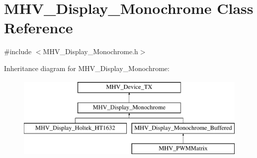 \hypertarget{class_m_h_v___display___monochrome}{
\section{\-M\-H\-V\-\_\-\-Display\-\_\-\-Monochrome \-Class \-Reference}
\label{class_m_h_v___display___monochrome}
}


{\ttfamily \#include $<$\-M\-H\-V\-\_\-\-Display\-\_\-\-Monochrome.\-h$>$}

\-Inheritance diagram for \-M\-H\-V\-\_\-\-Display\-\_\-\-Monochrome\-:\begin{figure}[H]
\begin{center}
\leavevmode
\includegraphics[height=4.000000cm]{class_m_h_v___display___monochrome}
\end{center}
\end{figure}
